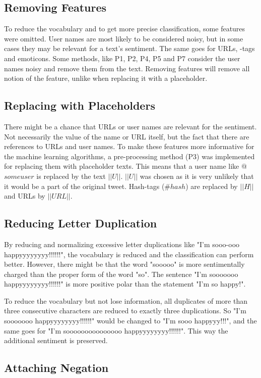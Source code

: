 \subsection{Removing Features}
To reduce the vocabulary and to get more precise classification, some features were omitted. User names are most likely to be considered noisy, but in some cases they may be relevant for a text's sentiment. The same goes for URLs, -tags and emoticons. Some methods, like P1, P2, P4, P5 and P7 consider the user names noisy and remove them from the text. Removing features will remove all notion of the feature, unlike when replacing it with a placeholder.

\subsection{Replacing with Placeholders}
There might be a chance that URLs or user names are relevant for the sentiment. Not necessarily the value of the name or URL itself, but the fact that there are references to URLs and user names. To make these features more informative for the machine learning algorithms, a pre-processing method (P3) was implemented for replacing them with placeholder texts. This means that a user name like $@$$someuser$ is replaced by the text $||U||$. $||U||$ was chosen as it is very unlikely that it would be a part of the original tweet. Hash-tags ($\#hash$) are replaced by $||H||$ and URLs by $||URL||$. 

\subsection{Reducing Letter Duplication}
By reducing and normalizing excessive letter duplications like "I'm sooo-ooo happyyyyyyyy!!!!!!", the vocabulary is reduced and the classification can perform better. However, there might be that the word "sooooo" is more sentimentally charged than the proper form of the word "so". The sentence "I'm sooooooo happyyyyyyyy!!!!!!" is more positive polar than the statement "I'm so happy!".

To reduce the vocabulary but not lose information, all duplicates of more than three consecutive characters are reduced to exactly three duplications. So "I'm sooooooo happyyyyyyyy!!!!!!" would be changed to "I'm sooo happyyy!!!", and the same goes for "I'm sooooooooooooooo happyyyyyyyy!!!!!!". This way the additional sentiment is preserved.

\subsection{Attaching Negation}


